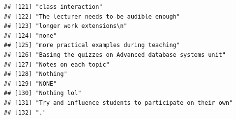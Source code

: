 \documentclass[
]{article}
\begin{document}
\begin{verbatim}
## [121] "class interaction"                                                                                                                                                                                                     
## [122] "The lecturer needs to be audible enough"                                                                                                                                                                               
## [123] "longer work extensions\n"                                                                                                                                                                                              
## [124] "none"                                                                                                                                                                                                                  
## [125] "more practical examples during teaching"                                                                                                                                                                               
## [126] "Basing the quizzes on Advanced database systems unit"                                                                                                                                                                  
## [127] "Notes on each topic"                                                                                                                                                                                                   
## [128] "Nothing"                                                                                                                                                                                                               
## [129] "NONE"                                                                                                                                                                                                                  
## [130] "Nothing lol"                                                                                                                                                                                                           
## [131] "Try and influence students to participate on their own"                                                                                                                                                                
## [132] "."                                                                                                                                                                                                                     

\end{verbatim}
\end{document}
